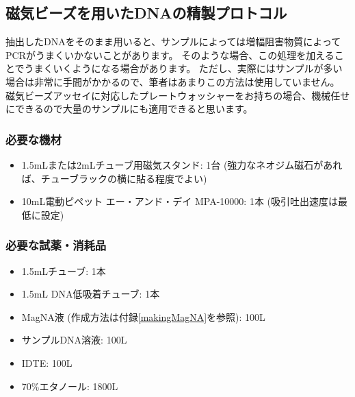 \documentclass[titlepage,10pt,a4paper,uplatex]{jsbook}
\begin{document}
\subsection{磁気ビーズを用いたDNAの精製プロトコル}\label{PCRinhibitorremoval}

抽出したDNAをそのまま用いると、サンプルによっては増幅阻害物質によってPCRがうまくいかないことがあります。
そのような場合、この処理を加えることでうまくいくようになる場合があります。
ただし、実際にはサンプルが多い場合は非常に手間がかかるので、筆者はあまりこの方法は使用していません。
磁気ビーズアッセイに対応したプレートウォッシャーをお持ちの場合、機械任せにできるので大量のサンプルにも適用できると思います。

\subsubsection{必要な機材}
\begin{itemize}
\item 1.5mLまたは2mLチューブ用磁気スタンド: 1台 (強力なネオジム磁石があれば、チューブラックの横に貼る程度でよい)
\item 10mL電動ピペット エー・アンド・デイ MPA-10000: 1本 (吸引吐出速度は最低に設定)
\end{itemize}

\subsubsection{必要な試薬・消耗品}
\begin{itemize}
\item 1.5mLチューブ: 1本
\item 1.5mL DNA低吸着チューブ: 1本
\item MagNA液 (作成方法は付録\ref{makingMagNA}を参照): 100{\textmu}L
\item サンプルDNA溶液: 100{\textmu}L
\item IDTE: 100{\textmu}L
\item 70\%エタノール: 1800{\textmu}L
\end{itemize}
\end{document}
